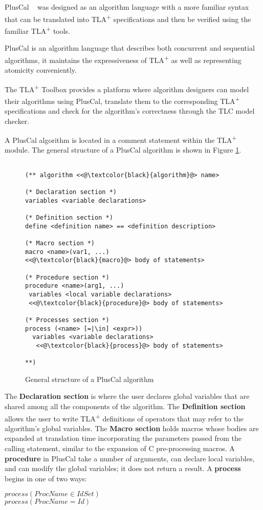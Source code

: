 \documentclass{article}
\newcommand{\tlaplus}{TLA\textsuperscript{+}\xspace}
\begin{document}
PlusCal ~\cite{pcalAlgo} was designed as an algorithm language with a more familiar syntax that can be translated into \tlaplus specifications and then be verified using the familiar \tlaplus tools.

PlusCal is an algorithm language that describes both concurrent and sequential algorithms, it maintains the expressiveness of \tlaplus as well as representing atomicity conveniently.

The \tlaplus Toolbox provides a platform where algorithm designers can model their algorithms using PlusCal, translate them to the corresponding \tlaplus specifications and check for the algorithm's correctness through the TLC model checker.

A PlusCal algorithm is located in a comment statement within the \tlaplus module. The general structure of a PlusCal algorithm is shown in Figure \ref{pluscal-struct}.

\begin{figure}
\begin{lstlisting}[language=pluscal, frame = tlrb, numbers = none]

(** algorithm <<@\textcolor{black}{algorithm}@> name>

(* Declaration section *)
variables <variable declarations>

(* Definition section *)
define <definition name> == <definition description>

(* Macro section *)
macro <name>(var1, ...)
<<@\textcolor{black}{macro}@> body of statements>

(* Procedure section *)
procedure <name>(arg1, ...)
 variables <local variable declarations>
 <<@\textcolor{black}{procedure}@> body of statements>

(* Processes section *)
process (<name> [=|\in] <expr>))
  variables <variable declarations>
   <<@\textcolor{black}{process}@> body of statements>

**)
\end{lstlisting}

\caption{General structure of a PlusCal algorithm}
\label{pluscal-struct}
\end{figure}


The \textbf{Declaration section} is where the user declares global variables that are shared among all the components of the algorithm. The \textbf{Definition section} allows the user to write \tlaplus definitions of operators that may refer to the algorithm's global variables.
The \textbf{Macro section} holds macros whose bodies are expanded at translation time incorporating the parameters passed from the calling statement, similar to the expansion of C pre-processing macros. A \textbf{procedure} in PlusCal take a number of arguments, can declare local variables, and can modify the global variables; it does not return a result. A \textbf{process} begins in one of two ways: 
\begin{center}
$process (ProcName \in IdSet)$ \\
$process (ProcName = Id)$
\end{center}
\end{document}
